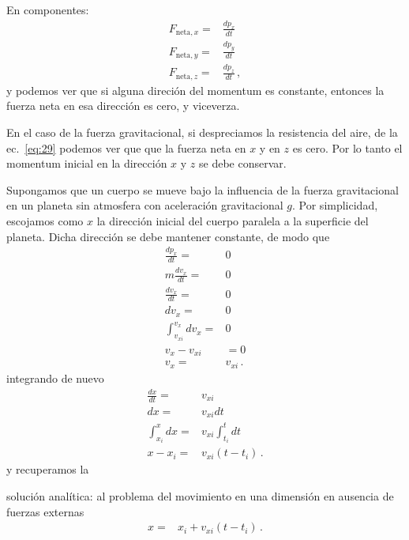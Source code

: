 En componentes:
\begin{align}
  F_{\text{neta},x}=&\frac{d p_x}{dt}\nonumber\\
  F_{\text{neta},y}=&\frac{d p_y}{dt}\nonumber\\
  F_{\text{neta},z}=&\frac{d p_z}{dt}\,,
\end{align}
y podemos ver que si alguna direción del momentum es constante, entonces la fuerza neta en esa dirección es cero, y viceverza.

En el caso de la fuerza gravitacional, si despreciamos la resistencia del aire, de la ec.~\eqref{eq:29} podemos ver que que la fuerza neta en $x$ y en $z$ es cero. Por lo tanto el momentum inicial en la dirección $x$ y $z$ se debe conservar. 

Supongamos que un cuerpo se mueve bajo la influencia de la fuerza gravitacional en un planeta sin atmosfera con aceleración gravitacional $g$. Por simplicidad, escojamos como $x$ la dirección inicial del cuerpo paralela a la superficie del planeta. Dicha dirección se debe mantener constante, de modo que
\begin{align*}
  \frac{d p_x}{dt}=&0\nonumber\\
  m\frac{d v_x}{dt}=&0\nonumber\\
  \frac{d v_x}{dt}=&0\nonumber\\
  {d v_x}=&0\nonumber\\
  \int_{v_{xi}}^{v_x}{d v_x}=&0\nonumber\\
  v_x-v_{xi}&=0\nonumber\\
  v_x=&v_{xi}\,.
\end{align*}
integrando de nuevo
\begin{align}
  \frac{dx}{dt}=&v_{xi}\nonumber\\
  dx=&v_{xi}{dt}\nonumber\\
  \int_{x_i}^x dx=&v_{xi}\int_{t_i}^t{dt}\nonumber\\
  x-x_i=&v_{xi}(t-t_i)\,.
\end{align}
y recuperamos la
\begin{frame}
  \begin{block}%
{solución analítica:} al problema del movimiento en una dimensión en ausencia de fuerzas externas
\begin{align}
  \label{eq:30}
  x=&x_i+v_{xi}(t-t_i)\,.
\end{align}
  \end{block}
\end{frame}


